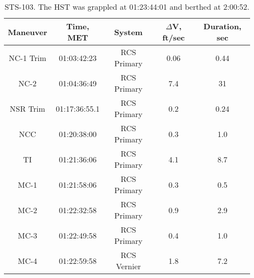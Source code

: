 \documentclass[onecolumn,10pt]{jhwhw}
\begin{document}

\begin{table}[h]
\begin{center}
\begin{tabular}{|c |c |c |c |c|}
\hline
Maneuver & Time, MET & System & $\Delta$V, ft/sec & Duration, sec \\
\hline
NC-1 Trim & 01:03:42:23    & RCS Primary & 0.06 & 0.44   \\ \hline
NC-2      & 01:04:36:49    & RCS Primary & 7.4  & 31     \\ \hline
NSR Trim  & 01:17:36:55.1  & RCS Primary & 0.2  & 0.24   \\ \hline
NCC       & 01:20:38:00    & RCS Primary & 0.3  & 1.0    \\ \hline
TI        & 01:21:36:06    & RCS Primary & 4.1  & 8.7    \\ \hline
MC-1      & 01:21:58:06    & RCS Primary & 0.3  & 0.5    \\ \hline
MC-2      & 01:22:32:58    & RCS Primary & 0.9  & 2.9    \\ \hline
MC-3      & 01:22:49:58    & RCS Primary & 0.4  & 1.0    \\ \hline
MC-4      & 01:22:59:58    & RCS Vernier & 1.8  & 7.2    \\ \hline
\end{tabular}
\end{center}
\caption{STS-103. The HST was grappled at 01:23:44:01 and berthed at 2:00:52.}
\end{table}
\end{document}
